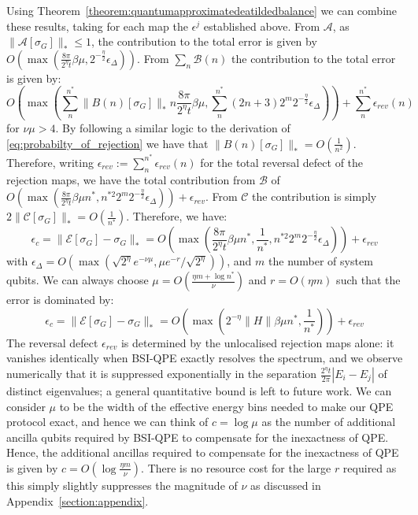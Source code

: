 \documentclass[aps,floatfix,10pt,amssymb,amsfont,amsmath,superscriptaddress,float,nofootinbib,longbibliography,nobalancelastpage,twocolumn]{revtex4-2}
\begin{document}
\begin{widetext}
Using Theorem~\ref{theorem:quantumapproximatedeatildedbalance} we can combine these results, taking for each map the $\epsilon^j$ established above. From $\mathcal{A}$, as $\|\mathcal{A}[\sigma_G]\|_* \leq 1$, the contribution to the total error is given by $O(\max(\frac{8\pi}{2^{\eta}t}\beta\mu,2^{-\frac{\eta}{2}}\epsilon_{\Delta}))$. From $\sum_n\mathcal{B}(n)$ the contribution to the total error is given by:
\begin{equation}
    O(\max(\sum^{n^*}_{n}\|B(n)[\sigma_G]\|_* n\frac{8\pi}{2^{\eta}t}\beta \mu ,\sum^{n^*}_{n}(2n+3)2^m2^{-\frac{\eta}{2}}\epsilon_{\Delta})) + \sum_{n}^{n^*}\epsilon_{rev}(n)
\end{equation}
for $\nu \mu > 4$. By following a similar logic to the derivation of \eqref{eq:probabilty_of_rejection} we have that $\|B(n)[\sigma_G]\|_* = O(\frac{1}{n^2})$. Therefore, writing $\epsilon_{rev} := \sum_{n}^{n^*}\epsilon_{rev}(n)$ for the total reversal defect of the rejection maps, we have the total contribution from $\mathcal{B}$ of $O(\max(\frac{8\pi}{2^{\eta}t}\beta \mu n^*,n^{*2}2^m2^{-\frac{\eta}{2}}\epsilon_{\Delta})) + \epsilon_{rev}$. From $\mathcal{C}$ the contribution is simply $2\|\mathcal{C}[\sigma_G]\|_* = O(\frac{1}{n^*})$. Therefore, we have:
 \begin{equation}
   \epsilon_c = \|\mathcal{E}[\sigma_G] - \sigma_G\|_* = O\left(\max\left( \frac{8\pi}{2^{\eta}t}\beta\mu n^* ,\frac{1}{n^*}, n^{*2}2^m2^{-\frac{\eta}{2}}\epsilon_{\Delta}\right)\right) + \epsilon_{rev}
\end{equation}
with $\epsilon_{\Delta}=O(\max(\sqrt{2^{\eta}}e^{-\nu\mu},\mu e^{-r}/\sqrt{2^{\eta}}))$, and $m$ the number of system qubits. We can always choose $\mu = O(\frac{\eta m + \log n^*}{\nu})$ and $r=O(\eta m)$ such that the error is dominated by:
 \begin{equation}
   \epsilon_c = \|\mathcal{E}[\sigma_G] - \sigma_G\|_* = O\left(\max\left( 2^{-\eta}\|H\|\beta\mu n^* ,\frac{1}{n^*}\right)\right) + \epsilon_{rev}
    \label{eq:error_bound}
\end{equation}
The reversal defect $\epsilon_{rev}$ is determined by the unlocalised rejection maps alone: it vanishes identically when BSI-QPE exactly resolves the spectrum, and we observe numerically that it is suppressed exponentially in the separation $\frac{2^{\eta}t}{2\pi}|E_i-E_j|$ of distinct eigenvalues; a general quantitative bound is left to future work. We can consider $\mu$ to be the width of the effective energy bins needed to make our QPE protocol exact, and hence we can think of $c = \log \mu$ as the number of additional ancilla qubits required by BSI-QPE to compensate for the inexactness of QPE. Hence, the additional ancillas required to compensate for the inexactness of QPE is given by $c = O(\log \frac{\eta m}{\nu})$. There is no resource cost for the large $r$ required as this simply slightly suppresses the magnitude of $\nu$ as discussed in Appendix~\ref{section:appendix}.


\end{widetext}
\end{document}
